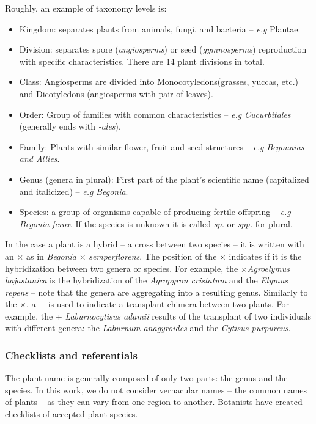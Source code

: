 Roughly, an example of taxonomy levels is:
\begin{itemize}
        \item Kingdom: separates plants from animals, fungi, and bacteria -- \emph{e.g} Plantae.
        \item Division: separates spore (\emph{angiosperms}) or seed (\emph{gymnosperms}) reproduction with specific characteristics. There are 14 plant divisions in total.
        \item Class: Angiosperms are divided into Monocotyledons(grasses, yuccas, etc.) and Dicotyledons (angiosperms with pair of leaves).
        \item Order: Group of families with common characteristics -- \emph{e.g} \emph{Cucurbitales} (generally ends with \emph{-ales}).
        \item Family: Plants with similar flower, fruit and seed structures -- \emph{e.g} \emph{Begonaias and Allies}.
        \item Genus (genera in plural): First part of the plant's scientific name (capitalized and italicized) -- \emph{e.g} \emph{Begonia}.
        \item Species: a group of organisms capable of producing fertile offspring -- \emph{e.g} \emph{Begonia ferox}. If the species is unknown it is called \emph{sp.} or \emph{spp.} for plural.
\end{itemize}

In the case a plant is a hybrid -- a cross between two species -- it is written with an × as in \emph{Begonia} × \emph{semperflorens}. The position of the × indicates if it is the hybridization between two genera or species.
For example, the ×\emph{Agroelymus hajastanica} is the hybridization of the \emph{Agropyron cristatum} and the \emph{Elymus repens} -- note that the genera are aggregating into a resulting genus.
Similarly to the ×, a + is used to indicate a transplant chimera between two plants.
For example, the + \emph{Laburnocytisus adamii} results of the transplant of two individuals with different genera: the \emph{Laburnum anagyroides} and the \emph{Cytisus purpureus}.


\subsubsection{Checklists and referentials}

The plant name is generally composed of only two parts: the genus and the species.
In this work, we do not consider vernacular names -- the common names of plants -- as they can vary from one region to another.
Botanists have created checklists of accepted plant species.

